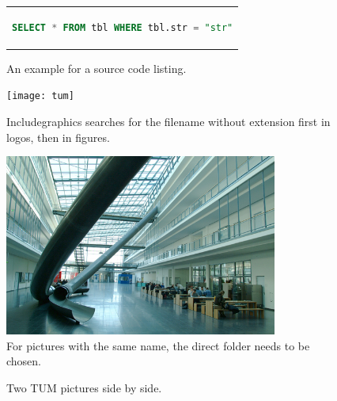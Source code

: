 \begin{figure}[htpb]
  \centering
  \begin{tabular}{c}
  \begin{lstlisting}[language=SQL]
    SELECT * FROM tbl WHERE tbl.str = "str"
  \end{lstlisting}
  \end{tabular}
  \caption[Example listing]{An example for a source code listing.}\label{fig:sample-listing}
\end{figure}

\begin{figure}[htpb]
  \centering
  \texttt{[image: tum]}
  \caption[Something else can be written here for listing this, otherwise the caption will be written!]{Includegraphics searches for the filename without extension first in logos, then in figures.} \label{fig:tum}
\end{figure}

\begin{figure}[htpb]
  \centering
  \includegraphics[width=0.8\textwidth]{figures/tum}
  \caption{For pictures with the same name, the direct folder needs to be chosen.} \label{fig:tumslide}
\end{figure}

\begin{figure}[!tbp]
  \centering
  \hfill
  \caption{Two TUM pictures side by side.}
  \label{fig:sidebyside}
\end{figure}

